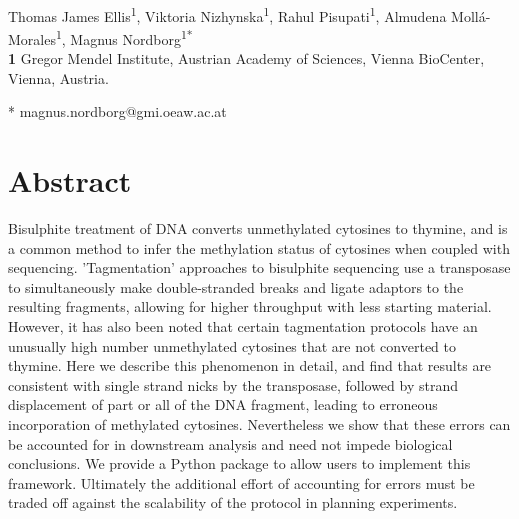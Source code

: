 \documentclass[10pt,letterpaper,draft]{article}
\begin{document}
\vspace*{0.2in}

\begin{flushleft}
{\Large
\textbf{} %
}
\newline
\\
Thomas James Ellis\textsuperscript{1},
Viktoria Nizhynska\textsuperscript{1},
Rahul Pisupati\textsuperscript{1},
Almudena Moll\'a-Morales\textsuperscript{1},
Magnus Nordborg\textsuperscript{1*}
\\
\bigskip
\textbf{1} Gregor Mendel Institute, Austrian Academy of Sciences, Vienna BioCenter, Vienna, Austria.
\\
\bigskip

* magnus.nordborg@gmi.oeaw.ac.at

\end{flushleft}
\section*{Abstract}
Bisulphite treatment of DNA converts unmethylated cytosines to thymine, and is a common method to infer the methylation status of cytosines when coupled with sequencing.
'Tagmentation' approaches to bisulphite sequencing use a transposase to simultaneously make double-stranded breaks and ligate adaptors to the resulting fragments, allowing for higher throughput with less starting material.
However, it has also been noted that certain tagmentation protocols have an unusually high number unmethylated cytosines that are not converted to thymine.
Here we describe this phenomenon in detail, and find that results are consistent with single strand nicks by the transposase, followed by strand displacement of part or all of the DNA fragment, leading to erroneous incorporation of methylated cytosines.
Nevertheless we show that these errors can be accounted for in downstream analysis and need not impede biological conclusions.
We provide a Python package to allow users to implement this framework.
Ultimately the additional effort of accounting for errors must be traded off against the scalability of the protocol in planning experiments.
\end{document}
